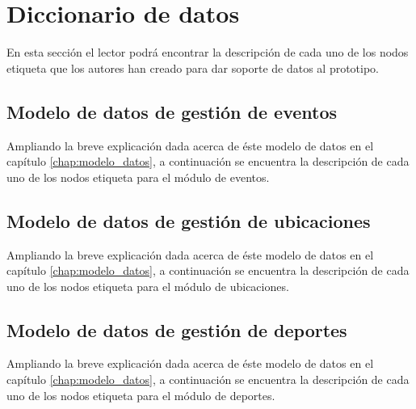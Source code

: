 \section{Diccionario de datos}
En esta sección el lector podrá encontrar la descripción de cada uno de los nodos etiqueta que los autores han creado para dar soporte de datos al prototipo.

\subsection{Modelo de datos de gestión de eventos}
Ampliando la breve explicación dada acerca de éste modelo de datos en el capítulo \ref{chap:modelo_datos}, a continuación se encuentra la descripción de cada uno de los nodos etiqueta para el módulo de eventos.

\clearpage


\subsection{Modelo de datos de gestión de ubicaciones}
Ampliando la breve explicación dada acerca de éste modelo de datos en el capítulo \ref{chap:modelo_datos}, a continuación se encuentra la descripción de cada uno de los nodos etiqueta para el módulo de ubicaciones.

\clearpage


\subsection{Modelo de datos de gestión de deportes}
Ampliando la breve explicación dada acerca de éste modelo de datos en el capítulo \ref{chap:modelo_datos}, a continuación se encuentra la descripción de cada uno de los nodos etiqueta para el módulo de deportes.

\clearpage
